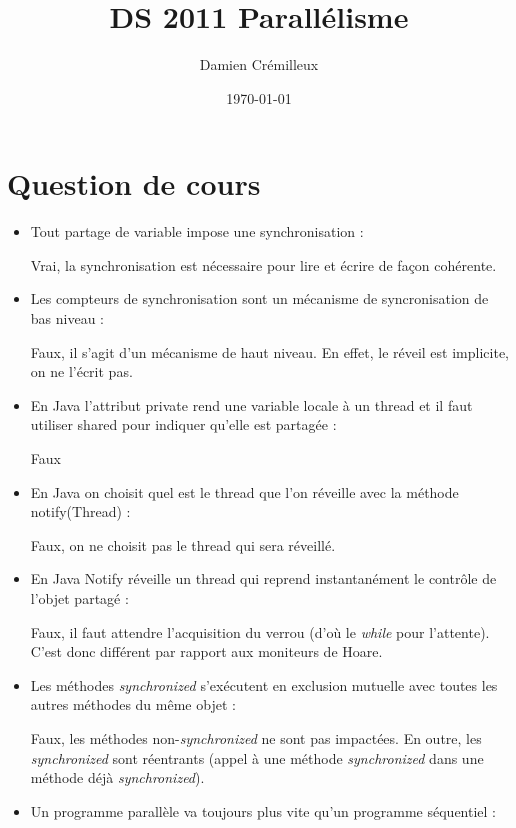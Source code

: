 \documentclass[a4paper]{article}
\begin{document}
\title{DS 2011 Parallélisme}
\author{Damien Crémilleux}
\date{\today}

\maketitle


\section{Question de cours}

\begin{itemize}
\item Tout partage de variable impose une synchronisation :

  Vrai, la synchronisation est nécessaire pour lire et écrire de façon cohérente.

\item Les compteurs de synchronisation sont un mécanisme de syncronisation de bas niveau :

  Faux, il s'agit d'un mécanisme de haut niveau. En effet, le réveil est implicite, on ne l'écrit pas.

\item En Java l'attribut private rend une variable locale à un thread et il faut utiliser shared pour indiquer qu'elle est partagée :

  Faux

\item En Java on choisit quel est le thread que l'on réveille avec la méthode notify(Thread) :
  
  Faux, on ne choisit pas le thread qui sera réveillé.

\item En Java Notify réveille un thread qui reprend instantanément le contrôle de l'objet partagé :
  
  Faux, il faut attendre l'acquisition du verrou (d'où le \textit{while} pour l'attente). C'est donc différent par rapport aux moniteurs de Hoare.

\item Les méthodes \textit{synchronized} s'exécutent en exclusion mutuelle avec toutes les autres méthodes du même objet :

  Faux, les méthodes non-\textit{synchronized} ne sont pas impactées. En outre, les \textit{synchronized} sont réentrants (appel à une méthode \textit{synchronized} dans une méthode déjà \textit{synchronized}).

\item Un programme parallèle va toujours plus vite qu'un programme séquentiel :


\end{itemize}
\end{document}
